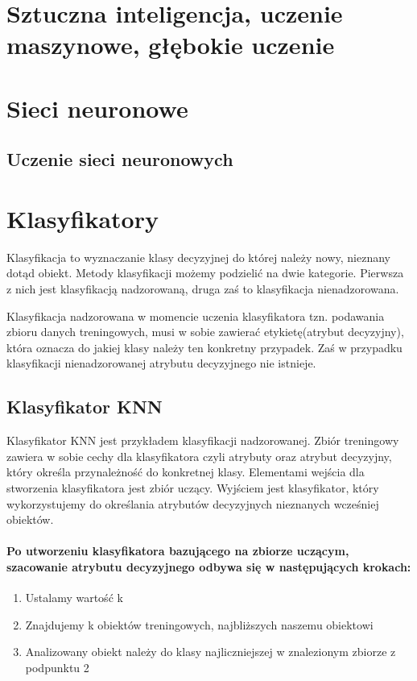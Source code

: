 \documentclass[a4paper,12pt,twoside,openany]{report}
\begin{document}
\section{Sztuczna inteligencja, uczenie maszynowe, głębokie uczenie}
\section{Sieci neuronowe}
\subsection{Uczenie sieci neuronowych}

\section{Klasyfikatory}
Klasyfikacja to wyznaczanie klasy decyzyjnej do której należy nowy, nieznany dotąd obiekt. Metody klasyfikacji możemy podzielić na dwie kategorie. Pierwsza z nich jest  klasyfikacją nadzorowaną, druga zaś to klasyfikacja nienadzorowana. 

Klasyfikacja nadzorowana w momencie uczenia klasyfikatora tzn. podawania zbioru danych treningowych, musi w sobie zawierać etykietę(atrybut decyzyjny), która oznacza do jakiej klasy należy ten konkretny przypadek. Zaś w przypadku klasyfikacji nienadzorowanej atrybutu decyzyjnego nie istnieje.

\subsection{Klasyfikator KNN}
Klasyfikator KNN jest przykładem klasyfikacji nadzorowanej. Zbiór treningowy zawiera w sobie cechy dla klasyfikatora czyli atrybuty oraz atrybut decyzyjny, który określa przynależność do konkretnej klasy. Elementami wejścia dla stworzenia klasyfikatora jest zbiór uczący. Wyjściem jest klasyfikator, który wykorzystujemy do określania atrybutów decyzyjnych nieznanych wcześniej obiektów.

\paragraph{Po utworzeniu klasyfikatora bazującego na zbiorze uczącym, szacowanie atrybutu decyzyjnego odbywa się w następujących krokach: }
\begin{enumerate}
	\item Ustalamy wartość k
	\item Znajdujemy k obiektów treningowych, najbliższych naszemu obiektowi
	\item Analizowany obiekt należy do klasy najliczniejszej w znalezionym zbiorze z podpunktu 2
\end{enumerate}
	
\end{document}
